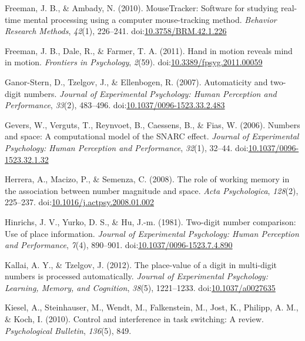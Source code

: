 \documentclass[english,man]{apa6}
\theoremstyle{definition}
\theoremstyle{definition}
\theoremstyle{definition}
\theoremstyle{remark}
\begin{document}
\hypertarget{ref-freemanAmbady2010}{}
Freeman, J. B., \& Ambady, N. (2010). MouseTracker: Software for
studying real-time mental processing using a computer mouse-tracking
method. \emph{Behavior Research Methods}, \emph{42}(1), 226--241.
doi:\href{https://doi.org/10.3758/BRM.42.1.226}{10.3758/BRM.42.1.226}

\hypertarget{ref-freemanDaleFarmer2011}{}
Freeman, J. B., Dale, R., \& Farmer, T. A. (2011). Hand in motion
reveals mind in motion. \emph{Frontiers in Psychology}, \emph{2}(59).
doi:\href{https://doi.org/10.3389/fpsyg.2011.00059}{10.3389/fpsyg.2011.00059}

\hypertarget{ref-ganorStern2007}{}
Ganor-Stern, D., Tzelgov, J., \& Ellenbogen, R. (2007). Automaticity and
two-digit numbers. \emph{Journal of Experimental Psychology: Human
Perception and Performance}, \emph{33}(2), 483--496.
doi:\href{https://doi.org/10.1037/0096-1523.33.2.483}{10.1037/0096-1523.33.2.483}

\hypertarget{ref-gevers2006}{}
Gevers, W., Verguts, T., Reynvoet, B., Caessens, B., \& Fias, W. (2006).
Numbers and space: A computational model of the SNARC effect.
\emph{Journal of Experimental Psychology: Human Perception and
Performance}, \emph{32}(1), 32--44.
doi:\href{https://doi.org/10.1037/0096-1523.32.1.32}{10.1037/0096-1523.32.1.32}

\hypertarget{ref-herrera2008}{}
Herrera, A., Macizo, P., \& Semenza, C. (2008). The role of working
memory in the association between number magnitude and space. \emph{Acta
Psychologica}, \emph{128}(2), 225--237.
doi:\href{https://doi.org/10.1016/j.actpsy.2008.01.002}{10.1016/j.actpsy.2008.01.002}

\hypertarget{ref-hinrichs1981}{}
Hinrichs, J. V., Yurko, D. S., \& Hu, J.-m. (1981). Two-digit number
comparison: Use of place information. \emph{Journal of Experimental
Psychology: Human Perception and Performance}, \emph{7}(4), 890--901.
doi:\href{https://doi.org/10.1037/0096-1523.7.4.890}{10.1037/0096-1523.7.4.890}

\hypertarget{ref-kallai2012}{}
Kallai, A. Y., \& Tzelgov, J. (2012). The place-value of a digit in
multi-digit numbers is processed automatically. \emph{Journal of
Experimental Psychology: Learning, Memory, and Cognition}, \emph{38}(5),
1221--1233.
doi:\href{https://doi.org/10.1037/a0027635}{10.1037/a0027635}

\hypertarget{ref-kiesel2010}{}
Kiesel, A., Steinhauser, M., Wendt, M., Falkenstein, M., Jost, K.,
Philipp, A. M., \& Koch, I. (2010). Control and interference in task
switching: A review. \emph{Psychological Bulletin}, \emph{136}(5), 849.
\end{document}
